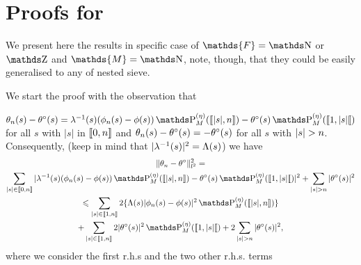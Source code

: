 \section{Proofs for }\label{pro:freq:ge:strat:kn}
We present here the results in specific case of $\mathds{F} = \N$ or $\Z$ and $\mathds{M} = \N$, note, though, that they could be easily generalised to any of nested sieve.
\begin{pro}\label{pro:freq:ge:strat:kn:co:agg}
We start the proof with the observation that

$\theta_{n}(s)-\fxdf[(s)]=\fedfI[(s)](\hfydf[(s)]-\fydf[(s)])\We[](\nset{ \vert s \vert,\ssY})-\fxdf[(s)]\We[](\nsetro{1, \vert s \vert})$ for all $s$ with $\vert s \vert$ in $\nset{0,\ssY}$ and $\theta_{n}(s)-\fxdf[(s)]=-\fxdf[(s)]$ for all $s$ with $\vert s \vert>\ssY$.
Consequently, (keep in mind that $\vert\fedfI[(s)]\vert^2=\iSv[s]$)  we  have
  \begin{multline}\label{freq:ge:strat:kn:co:agg:pro1}
    \Vnormlp{\theta_{n}-\xdf}^2=\\
   \sum_{\vert s \vert \in \nset{0,\ssY}}\vert\fedfI[(s)](\hfydf[(s)]-\fydf[(s)])\We[](\nset{\vert s \vert,\ssY})-\fxdf[(s)]\We[](\nsetro{1,\vert s\vert })\vert^2+\sum_{\vert s \vert>\ssY}\vert\fxdf[(s)]\vert^2\\
\leq
   \sum_{\vert s \vert \in\nset{1,\ssY}}2\{\iSv[s]\vert\hfydf[(s)]-\fydf[(s)]\vert^2 \We[](\nset{\vert s \vert ,\ssY})\}\\
   + \sum_{\vert s \vert \in \nset{1,\ssY}}2\vert\fxdf[(s)]\vert^2\We[](\nsetro{1,\vert s \vert})+2\sum_{\vert s \vert >n}\vert\fxdf[(s)]\vert^2,%
 \end{multline}
where we consider the first r.h.s and the two other r.h.s. terms

\end{pro}
